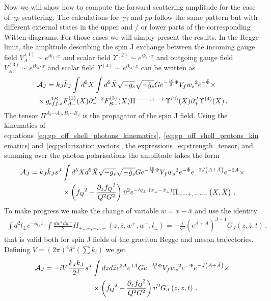 \documentclass[a4paper,12pt]{article}
\begin{document}
Now we will show how to compute the forward scattering amplitude for the case of $\gamma p$ scattering. The calculations for $\gamma \gamma$ and $pp$ follow the same pattern but with different external states in the upper and / or lower parts of the corresponding Witten diagrams. For those cases we will simply present the results. In the Regge limit, the amplitude describing the spin J exchange between the incoming gauge field $V_A^{(1)} \sim  e^{i k_1 \cdot x}$ and scalar field $\Upsilon^{(2)} \sim  e^{i k_2 \cdot x}$ and outgoing gauge field $V_A^{(3)} \sim  e^{i k_3 \cdot x}$ and scalar field $\Upsilon^{(4)} \sim  e^{i k_4 \cdot x}$ can be written as
\begin{align}
&\mathcal{A}_J = k_J \bar{k}_J \int d^5 X \int d^5 \bar{X} \sqrt{-g_s} \sqrt{-\bar{g}_s} G e^{-\frac{10}{3} \Phi} V_f {w_s}^2 e^{-\bar{\Phi}}  \times \notag \\ 
& \times g_{eff. s}^{AB} F^{(1)}_{A - } (X) \partial_{-}^{J-2}F^{(3)}_{B -} (X) \Pi^{- \cdots -, + \cdots +}  \Upsilon^{(2)}(\bar{X}) \partial_{+}^J \Upsilon^{(4)}(\bar{X}) \, .
\end{align}
The tensor $\Pi^{A_1 \cdots A_J, B_1 \cdots B_J}$ is the propagator of the spin J field. Using the kinematics of equations~\ref{eq:gp_off_shell_photons_kinematics},~\ref{eq:gp_off_shell_protons_kinematics} and~\ref{eq:polarization vectors}, the expressions~\ref{eq:strength_tensor} and summing over the photon polarisations the amplitude takes the form
\begin{align}
  \mathcal{A}_J = k_J \bar{k}_J s^J & \int d^5X d^5 \bar{X} \sqrt{-g_s} \sqrt{-\bar{g}_s}  G e^{-\frac{10}{3}\Phi} V_f {w_s}^2 e^{-\bar{\Phi}} e^{-2 J \left(A+\bar{A}\right)}  e^{-2A}  \times \notag \\
  &\times \left(  {f_Q}^2 + \frac{{\partial_z f_Q}^2}{Q^2 G^2}  \right) {\bar{\upsilon}}^2 e^{-i q_\perp \cdot \left( x_\perp - \bar{x}_\perp \right)} \Pi _{+\dots+,-\dots-}\left(X, \bar{X} \right) \, .
\end{align}
To make progress we make the change of variable $w = x - \bar{x}$ and use the identity
\begin{align}
 \int d^2 l_\perp e^{- i q_\perp l_\perp} \int \frac{dw^+ dw^-}{2} \Pi_{+ \dots +, - \dots -} \left(z, \bar{z}, w^+, w^-, l_\perp \right) = - \frac{i}{2^J} {\left( e^{A + \bar{A}} \right)}^{J-1}G_J \left(z, \bar{z}, t\right) \, ,
\label{eq:gJ_t_def}
\end{align}
that is valid both for spin J fields of the graviton Regge and meson trajectories. Defining $V = {\left(2 \pi\right)}^4 \delta^4\left( \sum k_i \right)$ we get
\begin{align}
  \mathcal{A}_J = - i V \frac{k_J \bar{k}_J}{2^J} s^J & \int dz d\bar{z} e^{2 A}e^{4 \bar{A}} G e^{-\frac{10}{3}\Phi} V_f {w_s}^2 e^{-\bar{\Phi}} e^{-J \left(A+\bar{A}\right)} \times \notag \\
 & \times \left(  {f_Q}^2 + \frac{{\partial_z f_Q}^2}{Q^2 G^2}  \right)  {\bar{\upsilon}}^2 G_J \left(z, \bar{z}, t\right) \, .
\end{align}
\end{document}
